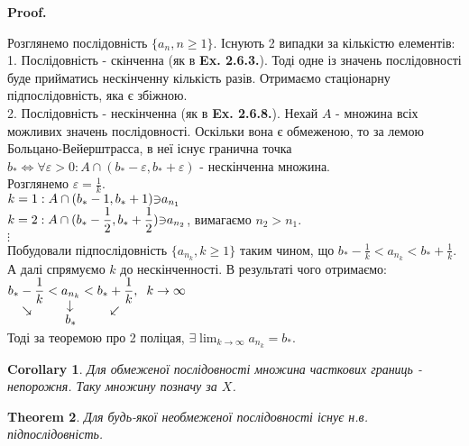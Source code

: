 \documentclass[a4paper, 14pt]{article}
\makeatletter
\def\qed{$\blacksquare$}
\theoremstyle{theoremdd}
\newtheorem{theorem}{Theorem}[subsection]
\theoremstyle{theoremdd}
\theoremstyle{theoremdd}
\theoremstyle{theoremdd}
\theoremstyle{theoremdd}
\theoremstyle{theoremdd}
\theoremstyle{theoremdd}
\theoremstyle{theoremdd}
\newtheorem{corollary}[theorem]{Corollary}
\renewenvironment{proof}[1][Proof.\\]{\par
\pushQED{\hfill \qed}%
\normalfont \topsep6\p@\@plus6\p@\relax
\trivlist
\item\relax
{\bfseries
#1\@addpunct{.}}\hspace\labelsep\ignorespaces
}{%
\popQED\endtrivlist\@endpefalse
}
\makeatother
\begin{document}
	\begin{proof}
	Розглянемо послідовність $\{a_n, n \geq 1\}$. Існують 2 випадки за кількістю елементів:\\
	1. Послідовність - скінченна (як в \textbf{Ex. 2.6.3.}). Тоді одне із значень послідовності буде прийматись нескінченну кількість разів. Отримаємо стаціонарну підпослідовність, яка є збіжною.
	\bigskip \\
	2. Послідовність - нескінченна (як в \textbf{Ex. 2.6.8.}). Нехай $A$ - множина всіх можливих значень послідовності. Оскільки вона є обмеженою, то за лемою Больцано-Вейерштрасса, в неї існує гранична точка $b_* \iff \forall \varepsilon > 0:A \cap (b_*-\varepsilon, b_*+\varepsilon)$ - нескінченна множина.\\
	Розглянемо $\varepsilon = \displaystyle \frac{1}{k}$.\\
	$\displaystyle k = 1: A \cap(b_*-1, b_*+1) \rotatebox[origin=c]{180}{$\in$}a_{n_1}$\\
	$\displaystyle k = 2: A \cap(b_*-\frac{1}{2}, b_*+\frac{1}{2}) \rotatebox[origin=c]{180}{$\in$}a_{n_2}$, вимагаємо $n_2>n_1$.\\
	$\vdots$\\
	Побудовали підпослідовність $\{a_{n_k}, k \geq 1\}$ таким чином, що $\displaystyle b_*-\frac{1}{k} < a_{n_k} < b_*+\frac{1}{k}$.\\
	А далі спрямуємо $k$ до нескінченності. В результаті чого отримаємо:\\
	$\displaystyle \underset{\rotatebox[origin=c]{-45}{$\rightarrow$}}{b_*-\frac{1}{k}} < \underset{\underset{\displaystyle b_*}{\rotatebox[origin=c]{90}{$\leftarrow$}}}{a_{n_k}} < \underset{\rotatebox[origin=c]{45}{$\leftarrow$}}{b_*+\frac{1}{k}}, \hspace{0.2cm} k \to \infty$\\
	Тоді за теоремою про 2 поліцая, $\displaystyle \exists \lim_{k \to \infty} a_{n_k} = b_*$.
	\end{proof}
	
	\begin{corollary}
	Для обмеженої послідовності множина часткових границь - непорожня. Таку множину позначу за $X$.
	\end{corollary}
		
	\begin{theorem} Для будь-якої необмеженої послідовності існує н.в. підпослідовність.
	\end{theorem}
	
\end{document}
